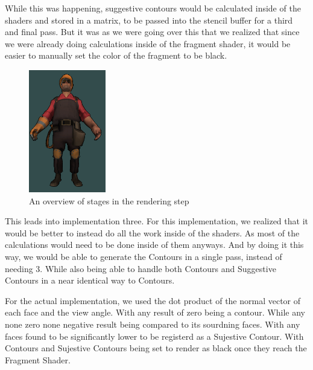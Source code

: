 While this was happening, suggestive contours would be calculated inside of the shaders and stored in a matrix, to be passed into the stencil buffer for a third and final pass. But it was as we were going over this that we realized that since we were already doing calculations inside of the fragment shader, it would be easier to manually set the color of the fragment to be black.

\begin{figure}[h]
    \centering
    \includegraphics[width=0.3\textwidth]{img/ModelD.png}
    \caption{An overview of stages in the rendering step}
    \label{fig-render-overview}
\end{figure}

This leads into implementation three. For this implementation, we realized that it would be better to instead do all the work inside of the shaders. As most of the calculations would need to be done inside of them anyways. And by doing it this way, we would be able to generate the Contours in a single pass, instead of needing 3. While also being able to handle both Contours and Suggestive Contours in a near identical way to Contours.

For the actual implementation, we used the dot product of the normal vector of each face and the view angle. With any result of zero being a contour. While any none zero none negative result being compared to its sourdning faces. With any faces found to be significantly lower to be registerd as a Sujestive Contour. With Contours and Sujestive Contours being set to render as black once they reach the Fragment Shader.